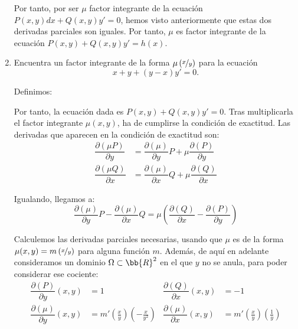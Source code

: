 \documentclass[12pt]{article}
\begin{document}
\begin{ejercicio}
\begin{enumerate}
        Por tanto, por ser $\mu$ factor integrante de la ecuación $P(x,y)dx+Q(x,y)y'=0$, hemos visto anteriormente que estas dos derivadas parciales son iguales. Por tanto, $\mu$ es factor integrante de la ecuación $P(x,y)+Q(x,y)y'=h(x)$.
        
        \item Encuentra un factor integrante de la forma $\mu\left(\nicefrac{x}{y}\right)$ para la ecuación
        \begin{equation*}
            x+y+(y-x)y'=0.
        \end{equation*}

        Definimos:

        Por tanto, la ecuación dada es $P(x,y)+Q(x,y)y'=0$. Tras multiplicarla el factor integrante $\mu(x,y)$, ha de cumplirse la condición de exactitud. Las derivadas que aparecen en la condición de exactitud son:
        \begin{align*}
            \dfrac{\partial(\mu P)}{\partial y}&=\dfrac{\partial(\mu)}{\partial y}P+\mu\dfrac{\partial(P)}{\partial y}\\
            \dfrac{\partial(\mu Q)}{\partial x}&=\dfrac{\partial(\mu)}{\partial x}Q+\mu\dfrac{\partial(Q)}{\partial x}
        \end{align*}

        Igualando, llegamos a:
        \begin{equation*}
            \dfrac{\partial(\mu)}{\partial y}P-\dfrac{\partial(\mu)}{\partial x}Q=\mu\left(\dfrac{\partial(Q)}{\partial x}-\dfrac{\partial(P)}{\partial y}\right)
        \end{equation*}

        Calculemos las derivadas parciales necesarias, usando que $\mu$ es de la forma $\mu(x,y)=m\left(\nicefrac{x}{y}\right)$ para alguna función $m$. Además, de aquí en adelante consideramos un dominio $\Omega\subset \bb{R}^2$ en el que $y$ no se anula, para poder considerar ese cociente:
        \begin{align*}
            \dfrac{\partial(P)}{\partial y}(x,y)&=1\qquad &\dfrac{\partial(Q)}{\partial x}(x,y)&=-1\\
            \dfrac{\partial(\mu)}{\partial y}(x,y)&=m'\left(\frac{x}{y}\right)\left(-\frac{x}{y^2}\right) &\dfrac{\partial(\mu)}{\partial x}(x,y)&=m'\left(\frac{x}{y}\right)\left(\frac{1}{y}\right)
        \end{align*}


\end{enumerate}
\end{ejercicio}
\end{document}
